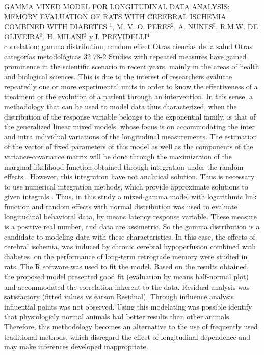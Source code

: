 \A
{GAMMA MIXED MODEL FOR LONGITUDINAL DATA ANALYSIS: MEMORY EVALUATION OF RATS WITH CEREBRAL ISCHEMIA COMBINED WITH DIABETES}
{$^1$, M. V. O. PERES$^2$, A. NUNES$^3$, R.M.W. DE OLIVEIRA$^3$, H. MILANI$^3$ y I. PREVIDELLI$^4$}
{
\\}
{correlation; gamma distribution; random effect} 
 {Otras ciencias de la salud} 
 {Otras categorías metodológicas} 
 {32} 
 {78-2}
{Studies with repeated measures have gained prominence in the scientific scenario in recent years, mainly in the areas of health and biological sciences. This is due to the interest of researchers evaluate repeatedly one or more experimental units in order to know the effectiveness of a treatment or the evolution of a patient through an intervention. In this sense, a methodology that can be used to model data thus characterized, when the distribution of the response variable belongs to the exponential family, is that of the generalized linear mixed models, whose focus is on accommodating the inter and intra individual variations of the longitudinal measurements. The estimation of the vector of fixed parameters of this model as well as the components of the variance-covariance matrix will be done through the maximization of the marginal likelihood function obtained through integration under the random effects . However, this integration have not analitical solution. Thus is necessary to use numerical integration methods, which provide approximate solutions to given integrals . Thus, in this study a mixed gamma model with logarithmic link function and random effects with normal distribution was used to evaluate longitudinal behavioral data, by means latency response variable. These measure is a positive real number, and data are assimetric. So the gamma distribution is a candidate to modeling data with these characteristics. In this case, the effects of cerebral ischemia, was induced by chronic cerebral hypoperfusion combined with diabetes, on the performance of long-term retrograde memory were studied in rats. The R software was used to fit the model. Based on the results obtained, the proposed model presented good fit (evaluation by means half-normal plot) and accommodated the correlation inherent to the data. Residual analysis was satisfactory (fitted values vs earson Residual). Through influence analysis influential points was not observed. Using this modelating was possible identify that physiologicly normal animals had better results than other animals. Therefore, this methodology becomes an alternative to the use of frequently used traditional methods, which disregard the effect of longitudinal dependence and may make inferences developed inappropriate.}
